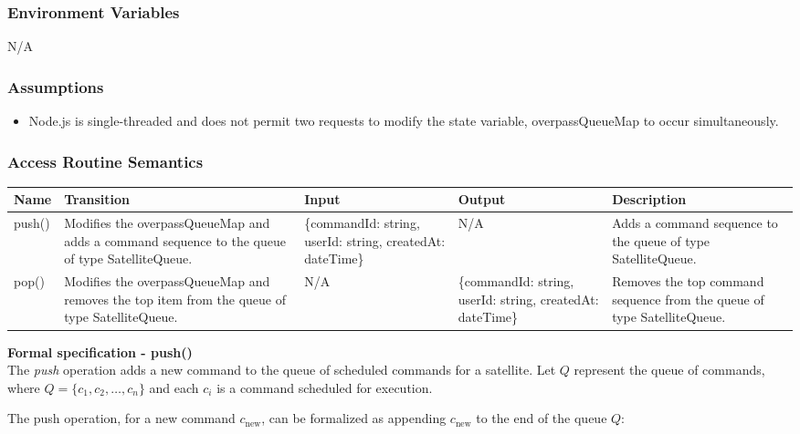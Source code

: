 \documentclass[12pt, titlepage]{article}
\begin{document}
\subsubsection{Environment Variables}
N/A


\subsubsection{Assumptions}

\begin{itemize}
    \item Node.js is single-threaded and does not permit two requests to modify the state variable, overpassQueueMap to occur simultaneously.
\end{itemize}

\subsubsection{Access Routine Semantics}

\begin{center}
\begin{tabular}{|p{1.6cm} |p{4cm} | p{2.5cm} |p{2.5cm} |p{4cm}|}
\hline
\textbf{Name} & \textbf{Transition} & \textbf{Input} & \textbf{Output} & \textbf{Description} \\
\hline
push() & Modifies the overpassQueueMap and adds a command sequence to the queue of type SatelliteQueue. & \{commandId: string, userId: string, createdAt: dateTime\} & N/A & Adds a command sequence to the queue of type SatelliteQueue. \\
\hline
pop() & Modifies the overpassQueueMap and removes the top item from the queue of type SatelliteQueue. & N/A & \{commandId: string, userId: string, createdAt: dateTime\} & Removes the top command sequence from the queue of type SatelliteQueue. \\
\hline
\end{tabular}
\end{center}

\textbf{Formal specification - push()} \\
The \textit{push} operation adds a new command to the queue of scheduled commands for a satellite. Let $Q$ represent the queue of commands, where $Q = \{c_1, c_2, \ldots, c_n\}$ and each $c_i$ is a command scheduled for execution.

The push operation, for a new command $c_{\text{new}}$, can be formalized as appending $c_{\text{new}}$ to the end of the queue $Q$:
\end{document}
